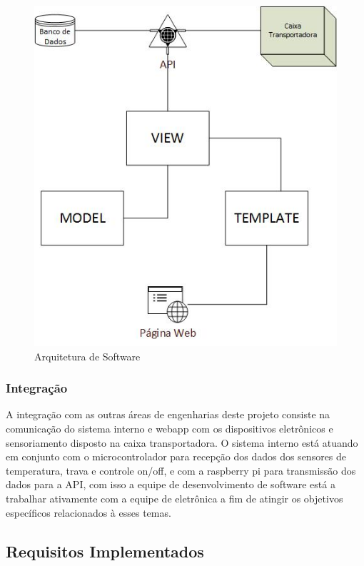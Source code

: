 \begin{figure}[H]
\centering
\includegraphics[width=16cm]{figuras/arquitetura_software.jpg}
\caption{Arquitetura de Software}
\end{figure}

\subsubsection{Integração}

	A integração com as outras áreas de engenharias deste projeto consiste na comunicação do sistema interno e webapp com os dispositivos eletrônicos e sensoriamento disposto na caixa transportadora. O sistema interno está atuando em conjunto com o microcontrolador para recepção dos dados dos sensores de temperatura, trava e controle on/off, e com a raspberry pi para transmissão dos dados para a API, com isso a equipe de desenvolvimento de software está a trabalhar ativamente com a equipe de eletrônica a fim de atingir os objetivos específicos relacionados à esses temas.

\subsection{Requisitos Implementados}
